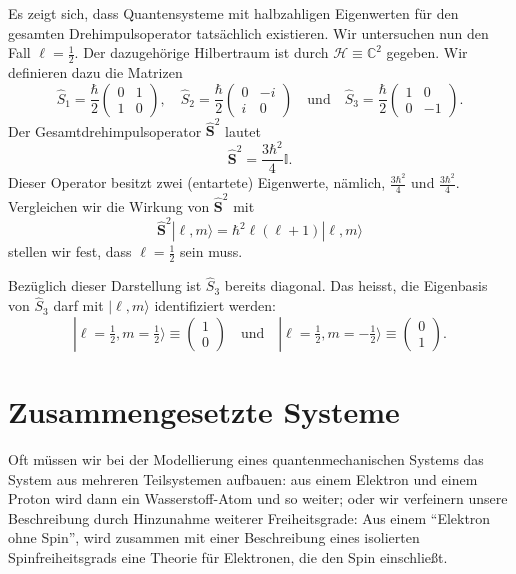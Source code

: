 Es zeigt sich, dass Quantensysteme mit halbzahligen Eigenwerten für den gesamten Drehimpulsoperator tatsächlich existieren. Wir untersuchen nun den Fall $\ell = \frac12$. Der dazugehörige Hilbertraum ist durch $\mathcal{H} \equiv \mathbb{C}^2$ gegeben. Wir definieren dazu die Matrizen
\begin{equation}
	\widehat{S}_1 = \frac{\hbar}{2} \begin{pmatrix}
		0 & 1 \\ 1 & 0
	\end{pmatrix}, \quad \widehat{S}_2 = \frac{\hbar}{2} \begin{pmatrix}
		0 & -i \\ i & 0
	\end{pmatrix} \quad \text{und} \quad \widehat{S}_3 = \frac{\hbar}{2} \begin{pmatrix}
		1 & 0 \\ 0 & -1
	\end{pmatrix}.
\end{equation}
Der Gesamtdrehimpulsoperator $\widehat{\mathbf{S}}^2$ lautet
\begin{equation}
	\widehat{\mathbf{S}}^2 = \frac{3\hbar^2}{4} \mathbb{I}.
\end{equation}
Dieser Operator besitzt zwei (entartete) Eigenwerte, nämlich, $\frac{3\hbar^2}{4}$ und $\frac{3\hbar^2}{4}$. Vergleichen wir die Wirkung von $\widehat{\mathbf{S}}^2$ mit 
\begin{equation}
	\widehat{\mathbf{S}}^2|\ell,m\rangle = \hbar^2\ell(\ell+1)|\ell,m\rangle
\end{equation}
stellen wir fest, dass $\ell=\frac12$ sein muss. 

Bezüglich dieser Darstellung ist $\widehat{S}_3$ bereits diagonal. Das heisst, die Eigenbasis von $\widehat{S}_3$ darf mit $|\ell,m\rangle$ identifiziert werden:
\begin{equation}
	|\ell=\tfrac12,m=\tfrac12\rangle \equiv \begin{pmatrix}
		1 \\ 0
	\end{pmatrix}\quad\text{und}\quad 
	|\ell=\tfrac12,m=-\tfrac12\rangle \equiv\begin{pmatrix}
		0 \\ 1
	\end{pmatrix}.
\end{equation}

\section*{Zusammengesetzte Systeme}
Oft müssen wir bei der Modellierung eines quantenmechanischen Systems das System aus mehreren Teilsystemen aufbauen: aus einem Elektron und einem Proton wird dann ein Wasserstoff-Atom und so weiter; oder wir verfeinern unsere Beschreibung durch Hinzunahme weiterer Freiheitsgrade: Aus einem ``Elektron ohne Spin'', wird zusammen mit einer Beschreibung eines isolierten Spinfreiheitsgrads eine Theorie für Elektronen, die den Spin einschließt.

